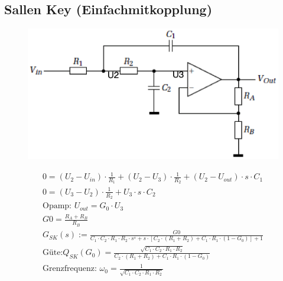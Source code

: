 \subsection{Sallen Key (Einfachmitkopplung)}
\begin{figure}[htb]
\centering
 \includegraphics[scale=0.5]{pictures/sallenkey}
\end{figure}
\begin{gather}
0=(U_2-U_{in})\cdot \frac{1}{R_1}+(U_2-U_3)\cdot \frac{1}{R_2}+(U_2-U_{out})\cdot s\cdot C_1\\
0=(U_3-U_2)\cdot \frac{1}{R_2}+U_3\cdot s\cdot C_2\\
\text{Opamp: }U_{out}=G_0\cdot U_3\\
G0=\frac{R_{A}+R_{B}}{R_{B}}\\
G_{SK}(s):=\frac{G0}{C_1\cdot C_2\cdot R_1\cdot R_2\cdot s^s+s\cdot [C_2\cdot (R_1+R_2)+C_1\cdot R_1\cdot (1-G_0)]+1}\\
\text{Güte:
}Q_{SK}(G_0)=\frac{\sqrt{C_1\cdot C_2\cdot R_1\cdot R_2}}{C_2\cdot (R_1+R_2)+C_1\cdot R_1\cdot (1-G_0)}\\
\text{Grenzfrequenz: }\omega_0=\frac{1}{\sqrt{C_1\cdot C_2\cdot R_1\cdot R_2}}
\end{gather}
